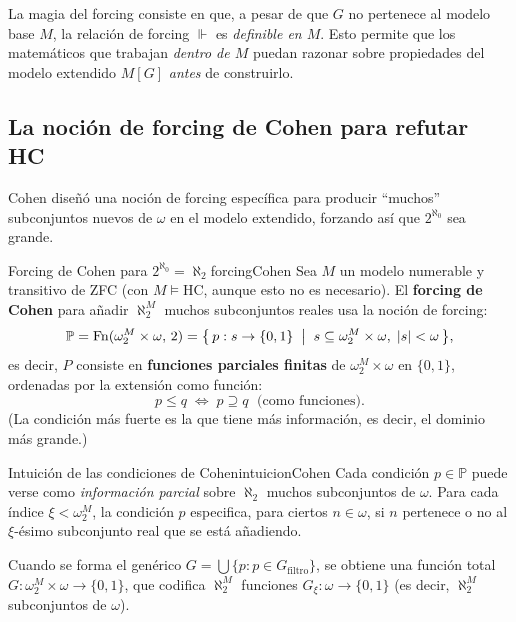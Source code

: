 \begin{importante}
La magia del forcing consiste en que, a pesar de que $G$ no pertenece al modelo base $M$, la relación de forcing $\Vdash$ es \emph{definible en $M$}. Esto permite que los matemáticos que trabajan \emph{dentro de $M$} puedan razonar sobre propiedades del modelo extendido $M[G]$ \emph{antes} de construirlo.
\end{importante}

\subsection{La noción de forcing de Cohen para refutar HC}

Cohen diseñó una noción de forcing específica para producir ``muchos'' subconjuntos nuevos de $\omega$ en el modelo extendido, forzando así que $2^{\aleph_0}$ sea grande.

\begin{definicion}{Forcing de Cohen para $2^{\aleph_0} = \aleph_2$}{forcingCohen}
Sea $M$ un modelo numerable y transitivo de ZFC (con $M \models \mathrm{HC}$, aunque esto no es necesario). El \textbf{forcing de Cohen} para añadir $\aleph_2^M$ muchos subconjuntos reales usa la noción de forcing:
\[
  \mathbb{P} = \mathrm{Fn}(\omega_2^M \times \omega,\, 2) = \bigl\{\, p : s \to \{0,1\} \;\bigm|\; s \subseteq \omega_2^M \times \omega,\; |s| < \omega \,\bigr\},
\]
es decir, $P$ consiste en \textbf{funciones parciales finitas} de $\omega_2^M \times \omega$ en $\{0,1\}$, ordenadas por la extensión como función:
\[
  p \leq q \;\iff\; p \supseteq q \;\text{ (como funciones)}.
\]
(La condición más fuerte es la que tiene más información, es decir, el dominio más grande.)
\end{definicion}

\begin{observacion}{Intuición de las condiciones de Cohen}{intuicionCohen}
Cada condición $p \in \mathbb{P}$ puede verse como \emph{información parcial} sobre $\aleph_2$ muchos subconjuntos de $\omega$. Para cada índice $\xi < \omega_2^M$, la condición $p$ especifica, para ciertos $n \in \omega$, si $n$ pertenece o no al $\xi$-ésimo subconjunto real que se está añadiendo.

Cuando se forma el genérico $G = \bigcup \{p : p \in G_{\text{filtro}}\}$, se obtiene una función total $G : \omega_2^M \times \omega \to \{0,1\}$, que codifica $\aleph_2^M$ funciones $G_\xi : \omega \to \{0,1\}$ (es decir, $\aleph_2^M$ subconjuntos de $\omega$).
\end{observacion}

